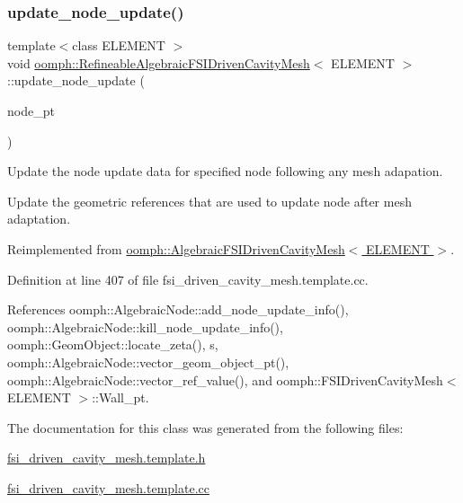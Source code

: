 \subsubsection{\texorpdfstring{update\+\_\+node\+\_\+update()}{update\_node\_update()}}
{\footnotesize\ttfamily template$<$class E\+L\+E\+M\+E\+NT $>$ \\
void \hyperlink{classoomph_1_1RefineableAlgebraicFSIDrivenCavityMesh}{oomph\+::\+Refineable\+Algebraic\+F\+S\+I\+Driven\+Cavity\+Mesh}$<$ E\+L\+E\+M\+E\+NT $>$\+::update\+\_\+node\+\_\+update (\begin{DoxyParamCaption}\item[{\hyperlink{classoomph_1_1AlgebraicNode}{Algebraic\+Node} $\ast$\&}]{node\+\_\+pt }\end{DoxyParamCaption})\hspace{0.3cm}{\ttfamily [virtual]}}



Update the node update data for specified node following any mesh adapation. 

Update the geometric references that are used to update node after mesh adaptation. 

Reimplemented from \hyperlink{classoomph_1_1AlgebraicFSIDrivenCavityMesh_a87d34d6cf84c62a9049773451c664176}{oomph\+::\+Algebraic\+F\+S\+I\+Driven\+Cavity\+Mesh$<$ E\+L\+E\+M\+E\+N\+T $>$}.



Definition at line 407 of file fsi\+\_\+driven\+\_\+cavity\+\_\+mesh.\+template.\+cc.



References oomph\+::\+Algebraic\+Node\+::add\+\_\+node\+\_\+update\+\_\+info(), oomph\+::\+Algebraic\+Node\+::kill\+\_\+node\+\_\+update\+\_\+info(), oomph\+::\+Geom\+Object\+::locate\+\_\+zeta(), s, oomph\+::\+Algebraic\+Node\+::vector\+\_\+geom\+\_\+object\+\_\+pt(), oomph\+::\+Algebraic\+Node\+::vector\+\_\+ref\+\_\+value(), and oomph\+::\+F\+S\+I\+Driven\+Cavity\+Mesh$<$ E\+L\+E\+M\+E\+N\+T $>$\+::\+Wall\+\_\+pt.



The documentation for this class was generated from the following files\+:\begin{DoxyCompactItemize}
\item 
\hyperlink{fsi__driven__cavity__mesh_8template_8h}{fsi\+\_\+driven\+\_\+cavity\+\_\+mesh.\+template.\+h}\item 
\hyperlink{fsi__driven__cavity__mesh_8template_8cc}{fsi\+\_\+driven\+\_\+cavity\+\_\+mesh.\+template.\+cc}\end{DoxyCompactItemize}
